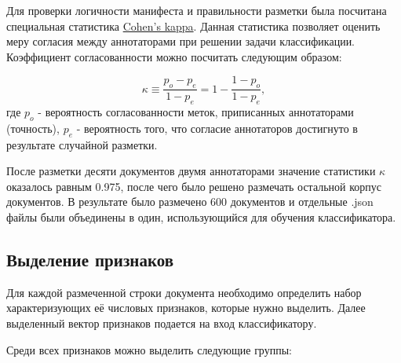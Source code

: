 \documentclass[a4paper,12pt]{article}
\begin{document}
Для проверки логичности манифеста и правильности разметки была посчитана специальная статистика \href{https://en.wikipedia.org/wiki/Cohen%27s_kappa}{Cohen's kappa}. Данная статистика позволяет оценить меру согласия между аннотаторами при решении задачи классификации. Коэффициент согласованности можно посчитать следующим образом:

$$ \kappa \equiv {\frac {p_o-p_e}{1-p_e}}=1-{\frac {1-p_o}{1-p_e}},$$
где $p_o$ - вероятность согласованности меток, приписанных аннотаторами (точность), $p_e$ - вероятность того, что согласие аннотаторов достигнуто в результате случайной разметки.

После разметки десяти документов двумя аннотаторами значение статистики $\kappa$ оказалось равным 0.975, после чего было решено размечать остальной корпус документов. В результате было размечено 600 документов и отдельные .json файлы были объединены в один, использующийся для обучения классификатора.

\subsection{Выделение признаков}

Для каждой размеченной строки документа необходимо определить набор характеризующих её числовых признаков, которые нужно выделить. Далее выделенный вектор признаков подается на вход классификатору.

Среди всех признаков можно выделить следующие группы:
\end{document}
